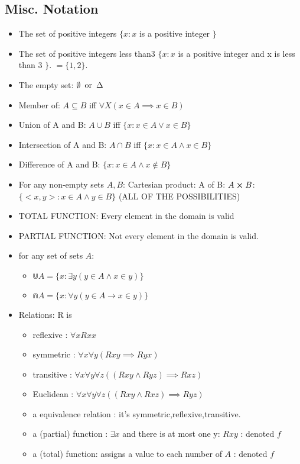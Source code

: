 
\subsection{Misc. Notation}

\begin{itemize}
\item The set of positive integers $\{ x : x$ is a positive integer $\}$ 
\item The set of positive integers less than3 $\{ x : x $ is a positive integer and x is less than 3 $\}$. $= \{1,2\}$. 
\item The empty set: $\emptyset \operatorname{\text{ or }} \Delta$ 
\item Member of: $A \subseteq B$ iff $\forall X (x \in A \implies x \in B )$ 
\item Union of A and B: $A \cup B $ iff $\{ x : x \in A \lor x \in B \}$
\item Intersection of A and B: $A \cap B $ iff $\{ x : x \in A \land x \in B \}$
\item Difference of A and B: $\{ x : x \in A \land x \not \in B \}$
\item For any non-empty sets $A,B$:
Cartesian product: A of B: $A \cross B$: $\{<x,y>: x \in A \land y \in B \}$ (ALL OF THE POSSIBILITIES)
\item TOTAL FUNCTION: Every element in the domain is valid
\item PARTIAL FUNCTION: Not every element in the domain is valid.
\item for any set of sets $A$:
\begin{itemize}
\item $\Cup A = \{ x : \exists y ( y \in A \land x \in y ) \}$ 
\item $\Cap A = \{ x : \forall y (y \in A \to x \in y )\}$ 
\end{itemize}
\item Relations: R is 
\begin{itemize}
\item reflexive : $\forall x Rxx$
\item symmetric : $\forall x \forall y (Rxy \implies Ryx)$
\item transitive : $\forall x \forall y \forall z ((Rxy \land Ryz) \implies Rxz)$
\item Euclidean : $\forall x \forall y \forall z ((Rxy \land Rxz ) \implies Ryz)$
\item a equivalence relation : it's symmetric,reflexive,transitive.
\item a (partial) function : $\exists x$ and there is at most one y: $Rxy$ : denoted $f$
\item a (total) function: assigns a value to each number of $A$ : denoted $f$
\end{itemize}


\end{itemize}
